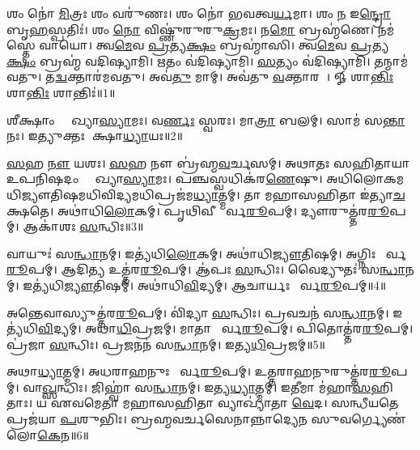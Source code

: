 \setcounter{anuvakam}{0}

𑌶𑌂 𑌨𑍋॑ \ul{𑌮𑌿}𑌤𑍍𑌰𑌃 𑌶𑌂 𑌵𑌰𑍁॑𑌣𑌃। 
𑌶𑌂 𑌨𑍋॑ 𑌭𑌵𑌤𑍍𑌵\ul{𑌰𑍍𑌯}𑌮𑌾। 
𑌶𑌂 \ul{𑌨} 𑌇\ul{𑌨𑍍𑌦𑍍𑌰𑍋} 𑌬𑍃\ul{𑌹}𑌸𑍍𑌪𑌤𑌿𑌃॑। 
𑌶𑌂 \ul{𑌨𑍋} 𑌵𑌿𑌷𑍍𑌣𑍁॑𑌰𑍁𑌰𑍁\ul{𑌕𑍍𑌰}𑌮𑌃। 
𑌨\ul{𑌮𑍋} 𑌬𑍍𑌰𑌹𑍍𑌮॑𑌣𑍇। 
𑌨𑌮॑𑌸𑍍𑌤𑍇 𑌵𑌾𑌯𑍋। 
𑌤𑍍𑌵\ul{𑌮𑍇}𑌵 \ul{𑌪𑍍𑌰}𑌤𑍍𑌯\ul{𑌕𑍍𑌷𑌂} 𑌬𑍍𑌰𑌹𑍍𑌮𑌾॑𑌸𑌿। 
𑌤𑍍𑌵\ul{𑌮𑍇}𑌵 \ul{𑌪𑍍𑌰}𑌤𑍍𑌯\ul{𑌕𑍍𑌷𑌂} 𑌬𑍍𑌰𑌹𑍍𑌮॑ 𑌵𑌦𑌿𑌷𑍍𑌯𑌾𑌮𑌿। 
\ul{𑌋}𑌤𑌂 𑌵॑𑌦𑌿𑌷𑍍𑌯𑌾𑌮𑌿। 
\ul{𑌸}𑌤𑍍𑌯𑌂 𑌵॑𑌦𑌿𑌷𑍍𑌯𑌾𑌮𑌿। 
𑌤𑌨𑍍𑌮𑌾𑌮॑𑌵𑌤𑍁। 
𑌤\ul{𑌦𑍍𑌵}𑌕𑍍𑌤𑌾𑌰॑𑌮𑌵𑌤𑍁। 
𑌅𑌵॑\ul{𑌤𑍁} 𑌮𑌾𑌮𑍍। 
𑌅𑌵॑𑌤𑍁 \ul{𑌵}𑌕𑍍𑌤𑌾𑌰𑌮𑍍᳚। 
𑍐 𑌶𑌾\ul{𑌨𑍍𑌤𑌿𑌃} 𑌶𑌾\ul{𑌨𑍍𑌤𑌿𑌃} 𑌶𑌾𑌨𑍍𑌤𑌿𑌃॑॥1॥%
\anuvakamend[\ul{𑌸}𑌤𑍍𑌯𑌂 𑌵॑𑌦𑌿𑌷𑍍𑌯𑌾\ul{𑌮𑌿} 𑌪𑌞𑍍𑌚॑ 𑌚]

𑌶𑍀𑌕𑍍𑌷𑌾𑌂 𑌵𑍍𑌯𑌾᳚𑌖𑍍𑌯𑌾\ul{𑌸𑍍𑌯𑌾}𑌮𑌃। 
𑌵\ul{𑌰𑍍𑌣𑌃} 𑌸𑍍𑌵𑌰𑌃। 
𑌮𑌾\ul{𑌤𑍍𑌰𑌾} 𑌬𑌲𑌮𑍍। 
𑌸𑌾𑌮॑ 𑌸\ul{𑌨𑍍𑌤𑌾}𑌨𑌃। 
𑌇𑌤𑍍𑌯𑍁𑌕𑍍𑌤𑌃 𑌶𑍀᳚𑌕𑍍𑌷𑌾\ul{𑌧𑍍𑌯𑌾}𑌯𑌃॥2॥
\anuvakamend[𑌶𑍀𑌕𑍍𑌷𑌾𑌂 𑌪𑌞𑍍𑌚॑]

\ul{𑌸}𑌹 \ul{𑌨𑍗} 𑌯𑌶𑌃। 
\ul{𑌸}𑌹 𑌨𑍗 𑌬𑍍𑌰॑𑌹𑍍𑌮\ul{𑌵}𑌰𑍍𑌚𑌸𑌮𑍍। 
𑌅𑌥𑌾𑌤𑌃 𑌸𑌹𑌿𑌤𑌾𑌯𑌾 𑌉𑌪𑌨𑌿𑌷𑌦𑌂 𑌵𑍍𑌯𑌾᳚𑌖𑍍𑌯𑌾\ul{𑌸𑍍𑌯𑌾}𑌮𑌃। 
𑌪𑌞𑍍𑌚𑌸𑍍𑌵𑌧𑌿𑌕॑𑌰\ul{𑌣𑍇}𑌷𑍁। 
𑌅𑌧𑌿𑌲𑍋𑌕𑌮𑌧𑌿\-𑌜𑍍𑌯𑍗𑌤𑌿𑌷𑌮𑌧𑌿\-𑌵𑌿𑌦𑍍𑌯𑌮𑌧𑌿\-𑌪𑍍𑌰𑌜॑𑌮\ul{𑌧𑍍𑌯𑌾}𑌤𑍍𑌮𑌮𑍍। 
𑌤𑌾 𑌮𑌹𑌾𑌸𑌹𑌿𑌤𑌾 𑌇॑𑌤𑍍𑌯𑌾\ul{𑌚}𑌕𑍍𑌷𑌤𑍇। 
𑌅𑌥𑌾॑𑌧𑌿\ul{𑌲𑍋}𑌕𑌮𑍍। 
𑌪𑍃𑌥𑌿𑌵𑍀 𑌪𑍂᳚𑌰𑍍𑌵\ul{𑌰𑍂}𑌪𑌮𑍍। 
𑌦𑍍𑌯𑍗𑌰𑍁𑌤𑍍𑌤॑𑌰\ul{𑌰𑍂}𑌪𑌮𑍍। 
𑌆𑌕𑌾॑𑌶𑌃 \ul{𑌸}𑌨𑍍𑌧𑌿𑌃॥3॥

𑌵𑌾𑌯𑍁𑌃॑ 𑌸\ul{𑌨𑍍𑌧𑌾}𑌨𑌮𑍍। 
𑌇𑌤𑍍𑌯॑𑌧𑌿\ul{𑌲𑍋}𑌕𑌮𑍍। 
𑌅𑌥𑌾॑𑌧𑌿\ul{𑌜𑍍𑌯𑍗}𑌤𑌿𑌷𑌮𑍍। 
𑌅𑌗𑍍𑌨𑌿𑌃 𑌪𑍂᳚𑌰𑍍𑌵\ul{𑌰𑍂}𑌪𑌮𑍍। 
𑌆𑌦𑌿𑌤𑍍𑌯 𑌉𑌤𑍍𑌤॑𑌰\ul{𑌰𑍂}𑌪𑌮𑍍। 
𑌆॑𑌪𑌃 \ul{𑌸}𑌨𑍍𑌧𑌿𑌃। 
𑌵𑍈𑌦𑍍𑌯𑍁𑌤𑌃॑ 𑌸\ul{𑌨𑍍𑌧𑌾}𑌨𑌮𑍍। 
𑌇𑌤𑍍𑌯॑𑌧𑌿\ul{𑌜𑍍𑌯𑍗}𑌤𑌿𑌷𑌮𑍍। 
𑌅𑌥𑌾॑𑌧𑌿\ul{𑌵𑌿}𑌦𑍍𑌯𑌮𑍍। 
𑌆𑌚𑌾𑌰𑍍𑌯𑌃 𑌪𑍂᳚𑌰𑍍𑌵\ul{𑌰𑍂}𑌪𑌮𑍍॥4॥

𑌅𑌨𑍍𑌤𑍇𑌵𑌾𑌸𑍍𑌯𑍁𑌤𑍍𑌤॑𑌰\ul{𑌰𑍂}𑌪𑌮𑍍। 
𑌵𑌿॑𑌦𑍍𑌯𑌾 \ul{𑌸}𑌨𑍍𑌧𑌿𑌃। 
𑌪𑍍𑌰𑌵𑌚𑌨॑ 𑌸\ul{𑌨𑍍𑌧𑌾}𑌨𑌮𑍍। 
𑌇𑌤𑍍𑌯॑𑌧𑌿\ul{𑌵𑌿}𑌦𑍍𑌯𑌮𑍍। 
𑌅𑌥𑌾\ul{𑌧𑌿}𑌪𑍍𑌰𑌜𑌮𑍍। 
𑌮𑌾𑌤𑌾 𑌪𑍂᳚𑌰𑍍𑌵\ul{𑌰𑍂}𑌪𑌮𑍍। 
𑌪𑌿𑌤𑍋𑌤𑍍𑌤॑𑌰\ul{𑌰𑍂}𑌪𑌮𑍍। 
𑌪𑍍𑌰॑𑌜𑌾 \ul{𑌸}𑌨𑍍𑌧𑌿𑌃। 
𑌪𑍍𑌰𑌜𑌨𑌨॑ 𑌸\ul{𑌨𑍍𑌧𑌾}𑌨𑌮𑍍। 
𑌇𑌤𑍍𑌯\ul{𑌧𑌿}𑌪𑍍𑌰𑌜𑌮𑍍॥5॥

𑌅𑌥𑌾\ul{𑌧𑍍𑌯𑌾}𑌤𑍍𑌮𑌮𑍍। 
𑌅𑌧𑌰𑌾𑌹𑌨𑍁𑌃 𑌪𑍂᳚𑌰𑍍𑌵\ul{𑌰𑍂}𑌪𑌮𑍍। 
𑌉𑌤𑍍𑌤𑌰𑌾𑌹𑌨𑍁𑌰𑍁𑌤𑍍𑌤॑𑌰\ul{𑌰𑍂}𑌪𑌮𑍍। 
𑌵𑌾\ul{𑌖𑍍𑌸}𑌨𑍍𑌧𑌿𑌃। 
𑌜𑌿𑌹𑍍𑌵𑌾॑ 𑌸\ul{𑌨𑍍𑌧𑌾}𑌨𑌮𑍍। 
𑌇𑌤𑍍𑌯\ul{𑌧𑍍𑌯𑌾}𑌤𑍍𑌮𑌮𑍍। 
𑌇𑌤𑍀𑌮𑌾 𑌮॑𑌹𑌾\ul{𑌸}\ul{}𑌹𑌿𑌤𑌾𑌃। 
𑌯 𑌏𑌵𑌮𑍇𑌤𑌾 𑌮𑌹𑌾𑌸𑌹𑌿𑌤𑌾 𑌵𑍍𑌯𑌾𑌖𑍍𑌯𑌾॑𑌤𑌾 \ul{𑌵𑍇}𑌦। 
𑌸𑌨𑍍𑌧𑍀𑌯𑌤𑍇 𑌪𑍍𑌰𑌜॑𑌯𑌾 \ul{𑌪}𑌶𑍁𑌭𑌿𑌃। 
𑌬𑍍𑌰𑌹𑍍𑌮𑌵𑌰𑍍𑌚𑌸𑍇𑌨𑌾𑌨𑍍𑌨𑌾𑌦𑍍𑌯𑍇𑌨 𑌸𑍁𑌵𑌰𑍍𑌗𑍍𑌯𑍇𑌣॑ 𑌲𑍋\ul{𑌕𑍇}𑌨॥6॥
\anuvakamend[\ul{𑌸}𑌨𑍍𑌧𑌿𑌰𑌾𑌚𑌾𑌰𑍍𑌯𑌃 𑌪𑍂᳚𑌰𑍍𑌵\ul{𑌰𑍂}𑌪𑌮𑌿𑌤𑍍𑌯\ul{𑌧𑌿}𑌪𑍍𑌰𑌜𑌂 𑌲𑍋॑\ul{𑌕𑍇}𑌨]

